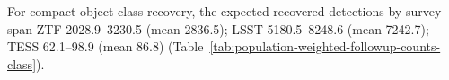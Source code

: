 For compact-object class recovery, the expected recovered detections by survey span ZTF 2028.9--3230.5 (mean 2836.5); LSST 5180.5--8248.6 (mean 7242.7); TESS 62.1--98.9 (mean 86.8) (Table~\ref{tab:population-weighted-followup-counts-class}).
